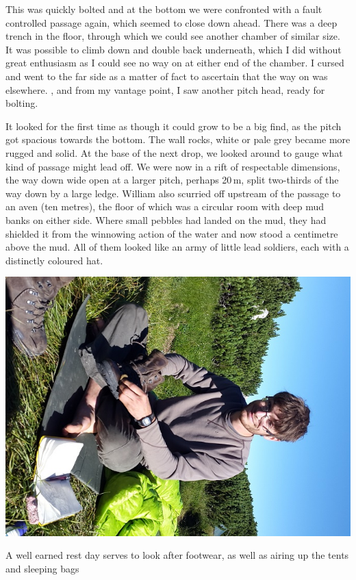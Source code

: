 
This was quickly bolted and at the bottom we were confronted with a fault controlled passage again, which seemed to close down ahead. There was a deep trench in the floor, through which we could see another chamber of similar size. It was possible to climb down and double back underneath, which I did without great enthusiasm as I could see no way on at either end of the chamber. I cursed and went to the far side as a matter of fact to ascertain that the way on was elsewhere. , and from my vantage point, I saw another pitch head, ready for bolting. 

 It looked for the first time as though it could grow to be a big find, as the pitch got spacious towards the bottom. The wall rocks, white or pale grey became more rugged and solid. At the base of the next drop, we looked around to gauge what kind of passage might lead off. We were now in a rift of respectable dimensions, the way down wide open at a larger pitch, perhaps 20\,m, split two-thirds of the way down by a large ledge. William also scurried off upstream of the passage to an aven (ten metres), the floor of which was a circular room with deep mud banks on either side. Where small pebbles had landed on the mud, they had shielded it from the winnowing action of the water and now stood a centimetre above the mud. All of them looked like an army of little lead soldiers, each with a distinctly coloured hat. 

\begin{marginfigure} \centering
	\includegraphics[width=\linewidth]{images/2017/tanguy-alabaster-2017/packing_up_tanguy.jpg}
	\caption{A well earned rest day serves to look after footwear, as well as airing up the tents and sleeping bags }
	\label{fig:clean shoes}
\end{marginfigure}

